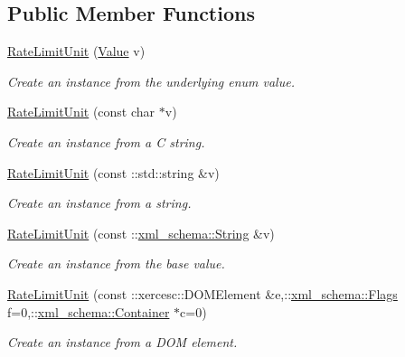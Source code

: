 \subsection*{Public Member Functions}
\begin{DoxyCompactItemize}
\item 
\hyperlink{classopenstack_1_1xml_1_1RateLimitUnit_aff6fc97927c25227a045350f5e7b9a2a}{RateLimitUnit} (\hyperlink{classopenstack_1_1xml_1_1RateLimitUnit_a0851d305ebaa03a6afb5335fbcd70b35}{Value} v)
\begin{DoxyCompactList}\small\item\em Create an instance from the underlying enum value. \item\end{DoxyCompactList}\item 
\hyperlink{classopenstack_1_1xml_1_1RateLimitUnit_ab781e1decb7072ef01cf75acb3bb20ff}{RateLimitUnit} (const char $\ast$v)
\begin{DoxyCompactList}\small\item\em Create an instance from a C string. \item\end{DoxyCompactList}\item 
\hyperlink{classopenstack_1_1xml_1_1RateLimitUnit_aefb36c1da9cd5be1d3061a2e9bc9f720}{RateLimitUnit} (const ::std::string \&v)
\begin{DoxyCompactList}\small\item\em Create an instance from a string. \item\end{DoxyCompactList}\item 
\hyperlink{classopenstack_1_1xml_1_1RateLimitUnit_ac72461319230076f39947e52fd53f214}{RateLimitUnit} (const ::\hyperlink{namespacexml__schema_af6757b5701ccc893f3b551bd70e0c94d}{xml\_\-schema::String} \&v)
\begin{DoxyCompactList}\small\item\em Create an instance from the base value. \item\end{DoxyCompactList}\item 
\hyperlink{classopenstack_1_1xml_1_1RateLimitUnit_a895e5730e2b74f7adb16021d1b37a6be}{RateLimitUnit} (const ::xercesc::DOMElement \&e,::\hyperlink{namespacexml__schema_affb4c227cbd9aa7453dd1dc5a1401943}{xml\_\-schema::Flags} f=0,::\hyperlink{namespacexml__schema_a333dea2213742aea47a37532dec4ec27}{xml\_\-schema::Container} $\ast$c=0)
\begin{DoxyCompactList}\small\item\em Create an instance from a DOM element. \item\end{DoxyCompactList}\item 

\end{DoxyCompactItemize}
